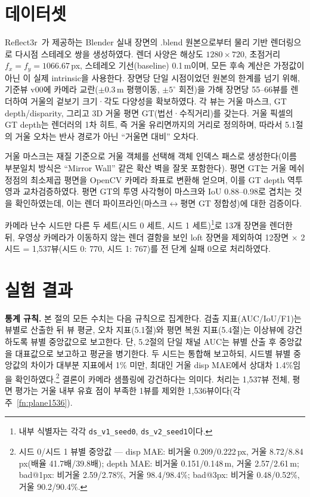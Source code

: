 \documentclass[twocolumn,10pt,a4paper]{article}
\begin{document}
\section{데이터셋}

Reflect3r~\cite{wu2026reflect3r}가 제공하는 Blender 실내 장면의 .blend 원본으로부터 물리 기반 렌더링으로 다시점 스테레오 쌍을 생성하였다. 렌더 사양은 해상도 $1280 \times 720$, 초점거리 $f_x = f_y = 1066.67$\,px, 스테레오 기선(baseline) 0.1\,m이며, 모든 후속 계산은 가정값이 아닌 이 실제 intrinsic을 사용한다. 장면당 단일 시점이었던 원본의 한계를 넘기 위해, 기준뷰 v00에 카메라 교란($\pm 0.3$\,m 평행이동, $\pm 5^{\circ}$ 회전)을 가해 장면당 55--66뷰를 렌더하여 거울의 겉보기 크기·각도 다양성을 확보하였다. 각 뷰는 거울 마스크, GT depth/disparity, 그리고 3D 거울 평면 GT(법선·수직거리)를 갖는다. 거울 픽셀의 GT depth는 렌더러의 1차 히트, 즉 거울 유리면까지의 거리로 정의하며, 따라서 5.1절의 거울 오차는 반사 경로가 아닌 ``거울면 대비'' 오차다.

거울 마스크는 재질 기준으로 거울 객체를 선택해 객체 인덱스 패스로 생성한다(이름 부분일치 방식은 ``Mirror Wall'' 같은 확산 벽을 잘못 포함한다). 평면 GT는 거울 메쉬 정점의 최소제곱 평면을 OpenCV 카메라 좌표로 변환해 얻으며, 이를 GT depth 역투영과 교차검증하였다. 평면 GT의 투영 사각형이 마스크와 IoU 0.88--0.98로 겹치는 것을 확인하였는데, 이는 렌더 파이프라인(마스크$\leftrightarrow$평면 GT 정합성)에 대한 검증이다.

카메라 난수 시드만 다른 두 세트(시드 0 세트, 시드 1 세트)\footnote{내부 식별자는 각각 \texttt{ds\_v1\_seed0}, \texttt{ds\_v2\_seed1}이다.}로 13개 장면을 렌더한 뒤, 우영상 카메라가 이동하지 않는 렌더 결함을 보인 loft 장면을 제외하여 12장면 $\times$ 2시드 = 1,537뷰(시드 0: 770, 시드 1: 767)를 전 단계 실패 0으로 처리하였다.

\section{실험 결과}

\textbf{통계 규칙.} 본 절의 모든 수치는 다음 규칙으로 집계한다. 검출 지표(AUC/IoU/F1)는 뷰별로 산출한 뒤 뷰 평균, 오차 지표(5.1절)와 평면 복원 지표(5.4절)는 이상뷰에 강건하도록 뷰별 중앙값으로 보고한다. 단, 5.2절의 단일 채널 AUC는 뷰별 산출 후 중앙값을 대표값으로 보고하고 평균을 병기한다. 두 시드는 통합해 보고하되, 시드별 뷰별 중앙값의 차이가 대부분 지표에서 1\% 미만, 최대인 거울 disp MAE에서 상대차 1.4\%임을 확인하였다.\footnote{시드 0/시드 1 뷰별 중앙값 --- disp MAE: 비거울 0.209/0.222\,px, 거울 8.72/8.84\,px(배율 41.7배/39.8배); depth MAE: 비거울 0.151/0.148\,m, 거울 2.57/2.61\,m; bad@1px: 비거울 2.59/2.78\%, 거울 98.4/98.4\%; bad@3px: 비거울 0.48/0.52\%, 거울 90.2/90.4\%.\label{fn:seed}} 결론이 카메라 샘플링에 강건하다는 의미다. 처리는 1,537뷰 전체, 평면 평가는 거울 내부 유효 점이 부족한 1뷰를 제외한 1,536뷰이다(각주~\ref{fn:plane1536}).
\end{document}

